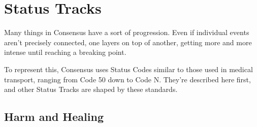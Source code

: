 \documentclass[
  oneside,
  statementpaper,
  9pt]{memoir}
\begin{document}
\newpage

\label{Status Tracks chapter}

\hypertarget{status-tracks-1}{%
\chapter{Status Tracks}\label{status-tracks-1}}

\begin{Narrator}

Many things in Consensus have a sort of progression. Even if individual events aren’t precisely connected, one layers on top of another, getting more and more intense until reaching a breaking point.

To represent this, Consensus uses Status Codes similar to those used in medical transport, ranging from Code 50 down to Code N. They're described here first, and other Status Tracks are shaped by these standards.

\end{Narrator}

\hypertarget{harm-and-healing}{%
\section{Harm and Healing}\label{harm-and-healing}}
\end{document}
